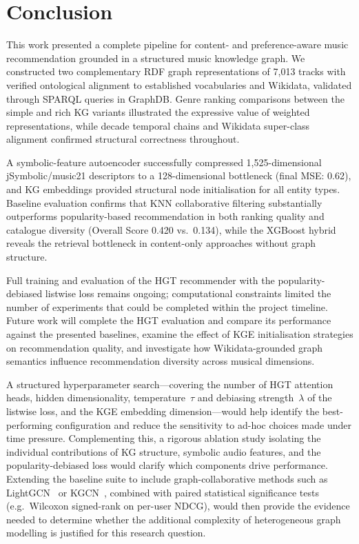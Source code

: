 \section{Conclusion}

This work presented a complete pipeline for content- and preference-aware music recommendation grounded in a structured music knowledge graph. We constructed two complementary RDF graph representations of 7,013 tracks with verified ontological alignment to established vocabularies and Wikidata, validated through SPARQL queries in GraphDB. Genre ranking comparisons between the simple and rich KG variants illustrated the expressive value of weighted representations, while decade temporal chains and Wikidata super-class alignment confirmed structural correctness throughout.

A symbolic-feature autoencoder successfully compressed 1,525-dimensional jSymbolic/music21 descriptors to a 128-dimensional bottleneck (final MSE: 0.62), and KG embeddings provided structural node initialisation for all entity types. Baseline evaluation confirms that KNN collaborative filtering substantially outperforms popularity-based recommendation in both ranking quality and catalogue diversity (Overall Score 0.420 vs.\ 0.134), while the XGBoost hybrid reveals the retrieval bottleneck in content-only approaches without graph structure.

Full training and evaluation of the HGT recommender with the popularity-debiased listwise loss remains ongoing; computational constraints limited the number of experiments that could be completed within the project timeline. Future work will complete the HGT evaluation and compare its performance against the presented baselines, examine the effect of KGE initialisation strategies on recommendation quality, and investigate how Wikidata-grounded graph semantics influence recommendation diversity across musical dimensions.

A structured hyperparameter search---covering the number of HGT attention heads, hidden dimensionality, temperature~$\tau$ and debiasing strength~$\lambda$ of the listwise loss, and the KGE embedding dimension---would help identify the best-performing configuration and reduce the sensitivity to ad-hoc choices made under time pressure. Complementing this, a rigorous ablation study isolating the individual contributions of KG structure, symbolic audio features, and the popularity-debiased loss would clarify which components drive performance. Extending the baseline suite to include graph-collaborative methods such as LightGCN~\cite{he2020lightgcn} or KGCN~\cite{wang2019kgcn}, combined with paired statistical significance tests (e.g.\ Wilcoxon signed-rank on per-user NDCG), would then provide the evidence needed to determine whether the additional complexity of heterogeneous graph modelling is justified for this research question.
